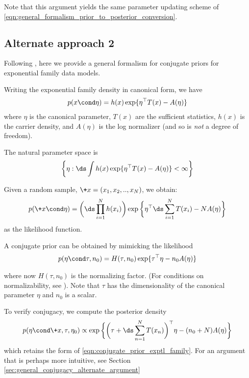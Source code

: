 \documentclass{article} %
\newcommand{\carrierDensity}{h}
\newcommand{\naturalParam}{\eta}
\begin{document}


Note that this argument yields the same parameter updating scheme of \eqref{eqn:general_formalism_prior_to_posterior_conversion}.


\subsection{Alternate approach 2} \label{sec:ef_general_formalism_jordan}

Following \cite{jordan2010conjugate}, here we provide a general formalism for conjugate priors for exponential family data models. 

Writing the exponential family density in canonical form, we have
\[ p(x \cond \naturalParam) = \carrierDensity(x) \exp \{ \naturalParam^\top T(x) - A(\naturalParam) \} \]
where $\naturalParam$ is the canonical parameter, $T(x)$ are the sufficient statistics,  $\carrierDensity(x)$ is the carrier density, and $A(\naturalParam)$ is the log normalizer (and so is \textit{not} a degree of freedom). 

The natural parameter space is 
\[  \bigg\{\naturalParam : \ds\int \carrierDensity(x) \exp \{ \naturalParam^\top T(x) - A(\naturalParam) \} < \infty \bigg \}\]

Given a random sample, $\+x=(x_1, x_2, .., x_N)$, we obtain:
\[ p(\+x \cond \naturalParam) = \bigg( \ds\prod_{i=1}^N \carrierDensity(x_i)  \bigg) \exp \bigg\{ \naturalParam^\top  \ds\sum_{i=1}^N T(x_i) - N A(\naturalParam) \bigg\} \]
as the likelihood function.

A conjugate prior can be obtained by mimicking the likelihood
\begin{equation}
p (\naturalParam \cond \tau, n_0) = H(\tau, n_0) \exp \{ \tau^\top \naturalParam - n_0 A(\naturalParam)\}
\label{eqn:conjugate_prior_exptl_family}
\end{equation}

where now $H(\tau, n_0)$ is the normalizing factor.  (For conditions on normalizability, see \cite{jordan2010conjugate}).   Note that $\tau$ has the dimensionality of the canonical parameter $\naturalParam$ and $n_0$ is a scalar.

To verify conjugacy, we compute the posterior density
\[ p (\naturalParam \cond \+x, \tau, \naturalParam_0)  \propto \exp \bigg\{ \bigg( \tau + \ds\sum_{n=1}^N  T(x_n) \bigg)^\top \naturalParam - (n_0 + N) A(\naturalParam) \bigg\} \]
which retains the form of \eqref{eqn:conjugate_prior_exptl_family}.  For an argument that is perhaps more intuitive, see Section \ref{sec:general_conjugacy_alternate_argument} 
\end{document}
